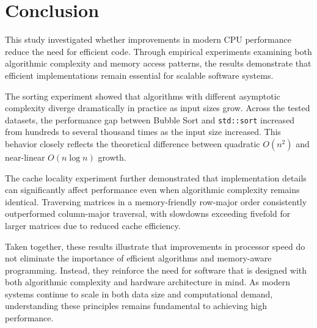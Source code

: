 \section{Conclusion}

This study investigated whether improvements in modern CPU performance reduce the need for efficient code. Through empirical experiments examining both algorithmic complexity and memory access patterns, the results demonstrate that efficient implementations remain essential for scalable software systems.

The sorting experiment showed that algorithms with different asymptotic complexity diverge dramatically in practice as input sizes grow. Across the tested datasets, the performance gap between Bubble Sort and \texttt{std::sort} increased from hundreds to several thousand times as the input size increased. This behavior closely reflects the theoretical difference between quadratic \(O(n^2)\) and near-linear \(O(n \log n)\) growth.

The cache locality experiment further demonstrated that implementation details can significantly affect performance even when algorithmic complexity remains identical. Traversing matrices in a memory-friendly row-major order consistently outperformed column-major traversal, with slowdowns exceeding fivefold for larger matrices due to reduced cache efficiency.

Taken together, these results illustrate that improvements in processor speed do not eliminate the importance of efficient algorithms and memory-aware programming. Instead, they reinforce the need for software that is designed with both algorithmic complexity and hardware architecture in mind. As modern systems continue to scale in both data size and computational demand, understanding these principles remains fundamental to achieving high performance.
